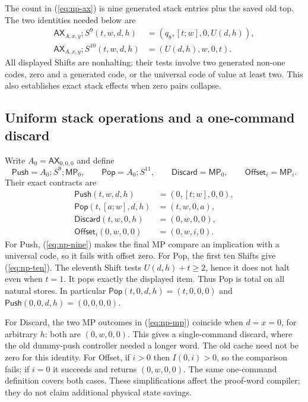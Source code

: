 The count in (\ref{eq:np-ax}) is nine generated stack entries plus the
saved old top. The two identities needed below are
\begin{align}
 \mathsf{AX}_{A,x,y};S^9(t,w,d,h)
   &=(q_8,[t;w],0,U(d,h)),\label{eq:np-nine}\\
 \mathsf{AX}_{A,x,y};S^{10}(t,w,d,h)
   &=(U(d,h),w,0,t).\label{eq:np-ten}
\end{align}
All displayed Shifts are nonhalting: their tests involve two generated
non-one codes, zero and a generated code, or the universal code of value
at least two. This also establishes exact stack effects when zero pairs
collapse.

\subsection{Uniform stack operations and a one-command discard}

Write $A_0=\mathsf{AX}_{0,0,0}$ and define
\[
 \mathsf{Push}=A_0;S^9;\mathsf{MP}_0,\qquad
 \mathsf{Pop}=A_0;S^{11},\qquad
 \mathsf{Discard}=\mathsf{MP}_0,\qquad
 \mathsf{Offset}_i=\mathsf{MP}_i.
\]
Their exact contracts are
\begin{align}
 \mathsf{Push}(t,w,d,h)&=(0,[t;w],0,0),\label{eq:np-push}\\
 \mathsf{Pop}(t,[a;w],d,h)&=(t,w,0,a),\label{eq:np-pop}\\
 \mathsf{Discard}(t,w,0,h)&=(0,w,0,0),\label{eq:np-discard}\\
 \mathsf{Offset}_i(0,w,0,0)&=(0,w,i,0).\label{eq:np-offset}
\end{align}
For Push, (\ref{eq:np-nine}) makes the final MP compare an implication
with a universal code, so it fails with offset zero. For Pop, the first
ten Shifts give (\ref{eq:np-ten}). The eleventh Shift tests
$U(d,h)+t\ge2$, hence it does not halt even when $t=1$.
It pops exactly the displayed item. Thus Pop is total on all natural
stores. In particular $\mathsf{Pop}(t,0,d,h)=(t,0,0,0)$ and
$\mathsf{Push}(0,0,d,h)=(0,0,0,0)$.

For Discard, the two MP outcomes in (\ref{eq:np-mp}) coincide when
$d=x=0$, for arbitrary $h$: both are $(0,w,0,0)$. This gives a single-command discard,
where the old dummy-push controller needed a longer word. The old cache
need not be zero for this identity. For Offset,
if $i>0$ then $I(0,i)>0$, so the comparison fails; if $i=0$ it succeeds
and returns $(0,w,0,0)$. The same one-command definition covers both cases.
These simplifications affect the proof-word compiler; they do not claim
additional physical state savings.

